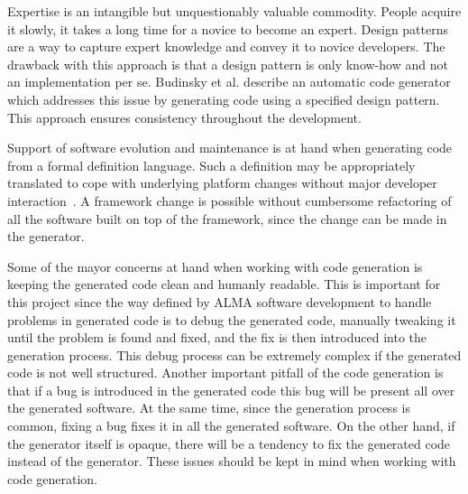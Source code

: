 Expertise is an intangible but unquestionably valuable commodity.
People acquire it slowly,
it takes a long time for a novice to become an expert.
Design patterns~\cite{gamma94:_design_patterns}
are a way to capture expert knowledge
and convey it to novice developers.
The drawback with this approach is that a design pattern
is only know-how and not an implementation per se.
Budinsky et al. describe an automatic code generator~%
   \cite{budinsky96:_automatic_code_generation}
which addresses this issue by generating code
using a specified design pattern.
This approach ensures consistency throughout the development.

Support of software evolution and maintenance is at hand
when generating code from a formal definition language.
Such a definition may be appropriately translated
to cope with underlying platform changes
without major developer interaction~\cite{floch95:_automatic_code_generator}.
A framework change is possible without cumbersome refactoring
of all the software built on top of the framework,
since the change can be made in the generator.

Some of the mayor concerns at hand
when working with code generation
is
keeping the generated code
clean and humanly readable.
This is important for this project since
the way defined by ALMA software development
to handle problems in generated code
is to debug
the generated code,
manually
tweaking it until the problem is found and fixed,
and the fix is then introduced into the generation process.
This debug process can be extremely complex if the
generated code is not well structured.
Another important pitfall of the code generation
is that if a bug is introduced in the generated code
this bug will be present all over the generated software.
At the same time, since the generation process is common,
fixing a bug
fixes it in all the generated software.
On the other hand,
if the generator itself is opaque,
there will be a tendency to fix the generated code instead of the generator.
These issues should be kept in mind when
working with code generation.

